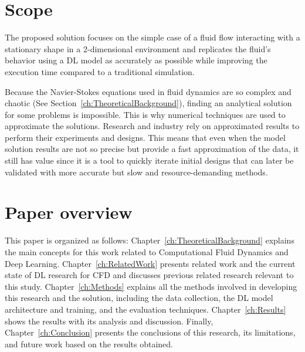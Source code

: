 \section{Scope}
\label{sec:Scope}
The proposed solution focuses on the simple case of a fluid flow interacting with a stationary shape in a 2-dimensional environment and replicates the fluid's behavior using a DL model as accurately as possible while improving the execution time compared to a traditional simulation. 

Because the Navier-Stokes equations used in fluid dynamics are so complex and chaotic (See Section~\ref{ch:TheoreticalBackground}), finding an analytical solution for some problems is impossible. This is why numerical techniques are used to approximate the solutions. Research and industry rely on approximated results to perform their experiments and designs. This means that even when the model solution results are not so precise but provide a fast approximation of the data, it still has value since it is a tool to quickly iterate initial designs that can later be validated with more accurate but slow and resource-demanding methods.

\section{Paper overview}
\label{sec:PaperOverview}
This paper is organized as follows: Chapter~\ref{ch:TheoreticalBackground} explains the main concepts for this work related to Computational Fluid Dynamics and Deep Learning. Chapter~\ref{ch:RelatedWork} presents related work and the current state of DL research for CFD and discusses previous related research relevant to this study. Chapter~\ref{ch:Methods} explains all the methods involved in developing this research and the solution, including the data collection, the DL model architecture and training, and the evaluation techniques. Chapter~\ref{ch:Results} shows the results with its analysis and discussion. Finally, Chapter~\ref{ch:Conclusion} presents the conclusions of this research, its limitations, and future work based on the results obtained.

